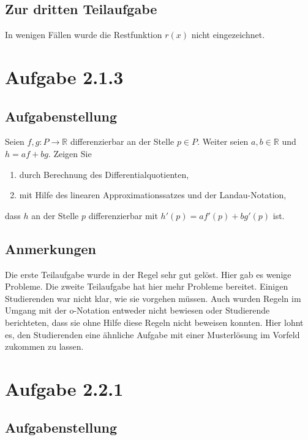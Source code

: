 \documentclass[a4paper]{article}
\newcommand*{\R}{\mathbb R}
\begin{document}
\subsection{Zur dritten Teilaufgabe}

In wenigen Fällen wurde die Restfunktion $r(x)$ nicht eingezeichnet.

\section{Aufgabe 2.1.3}

\subsection{Aufgabenstellung}

Seien $f,g:P\to\R$ differenzierbar an der Stelle $p\in P$. Weiter seien $a,b\in\R$ und $h=af+bg$. Zeigen Sie

\begin{enumerate}
  \item durch Berechnung des Differentialquotienten,
  \item mit Hilfe des linearen Approximationssatzes und der Landau-Notation,
\end{enumerate}

dass $h$ an der Stelle $p$ differenzierbar mit $h'(p)=af'(p)+bg'(p)$ ist.

\subsection{Anmerkungen}

Die erste Teilaufgabe wurde in der Regel sehr gut gelöst. Hier gab es wenige Probleme. Die zweite Teilaufgabe hat hier mehr Probleme bereitet. Einigen Studierenden war nicht klar, wie sie vorgehen müssen. Auch wurden Regeln im Umgang mit der o-Notation entweder nicht bewiesen oder Studierende berichteten, dass sie ohne Hilfe diese Regeln nicht beweisen konnten. Hier lohnt es, den Studierenden eine ähnliche Aufgabe mit einer Musterlösung im Vorfeld zukommen zu lassen.

\section{Aufgabe 2.2.1}

\subsection{Aufgabenstellung}
\end{document}
